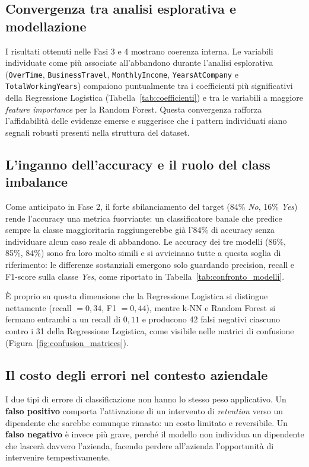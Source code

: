 \documentclass{article}
\begin{document}
\subsection{Convergenza tra analisi esplorativa e modellazione}
I risultati ottenuti nelle Fasi 3 e 4 mostrano coerenza interna.
Le variabili individuate come più associate all'abbandono durante l'analisi esplorativa (\texttt{OverTime}, \texttt{BusinessTravel}, \texttt{MonthlyIncome},
\texttt{YearsAtCompany} e \texttt{TotalWorkingYears}) compaiono puntualmente tra i coefficienti più significativi della Regressione Logistica
(Tabella~\ref{tab:coefficienti}) e tra le variabili a maggiore \emph{feature importance}
per la Random Forest. Questa convergenza rafforza l'affidabilità delle evidenze emerse e
suggerisce che i pattern individuati siano segnali robusti presenti nella struttura del dataset.
 
\subsection{L'inganno dell'accuracy e il ruolo del class imbalance}
Come anticipato in Fase 2, il forte sbilanciamento del target (84\% \emph{No},
16\% \emph{Yes}) rende l'accuracy una metrica fuorviante: un classificatore banale che
predice sempre la classe maggioritaria raggiungerebbe già l'84\% di accuracy senza
individuare alcun caso reale di abbandono. Le accuracy dei tre modelli (86\%, 85\%, 84\%)
sono fra loro molto simili e si avvicinano tutte a questa soglia di riferimento: le differenze sostanziali emergono solo guardando precision, recall e F1-score sulla classe \emph{Yes}, come riportato in Tabella~\ref{tab:confronto_modelli}.
 
\noindent È proprio su questa dimensione che la Regressione Logistica si distingue nettamente
(recall $= 0{,}34$, F1 $= 0{,}44$), mentre k-NN e Random Forest si fermano entrambi a
un recall di $0{,}11$ e producono 42 falsi negativi ciascuno contro i 31 della Regressione
Logistica, come visibile nelle matrici di confusione (Figura~\ref{fig:confusion_matrices}).
 
\subsection{Il costo degli errori nel contesto aziendale}
I due tipi di errore di classificazione non hanno lo stesso peso applicativo.
Un \textbf{falso positivo} comporta l'attivazione di un intervento di \emph{retention}
verso un dipendente che sarebbe comunque rimasto: un costo limitato e reversibile.
Un \textbf{falso negativo} è invece più grave, perché il modello non individua un
dipendente che lascerà davvero l'azienda, facendo perdere all'azienda
l'opportunità di intervenire tempestivamente.\\
 
\end{document}
